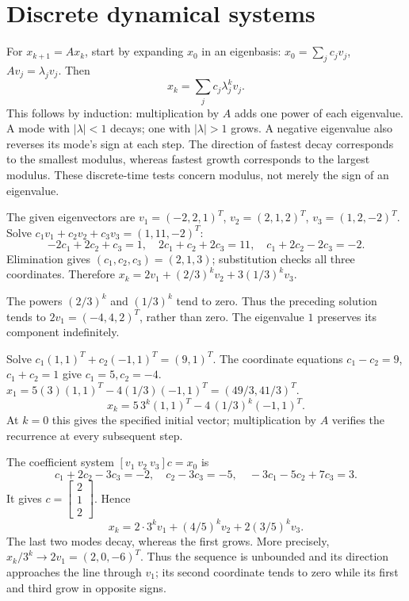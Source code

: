 \section{Discrete dynamical systems}
For $x_{k+1}=Ax_k$, start by expanding $x_0$ in an eigenbasis:
$x_0=\sum_j c_jv_j$, $Av_j=\lambda_jv_j$. Then
\[x_k=\sum_j c_j\lambda_j^kv_j.\]
This follows by induction: multiplication by $A$ adds one power of
each eigenvalue. A mode with $|\lambda|<1$ decays; one with
$|\lambda|>1$ grows. A negative eigenvalue also reverses its
mode's sign at each step. The direction of fastest decay corresponds
to the smallest modulus, whereas fastest growth corresponds to the
largest modulus. These discrete-time tests concern modulus, not merely
the sign of an eigenvalue.

The given eigenvectors are $v_1=(-2,2,1)^T$, $v_2=(2,1,2)^T$,
$v_3=(1,2,-2)^T$. Solve $c_1v_1+c_2v_2+c_3v_3=(1,11,-2)^T$:
\[-2c_1+2c_2+c_3=1,\quad2c_1+c_2+2c_3=11,
\quad c_1+2c_2-2c_3=-2.\]
Elimination gives $(c_1,c_2,c_3)=(2,1,3)$; substitution checks
all three coordinates. Therefore
$x_k=2v_1+(2/3)^kv_2+3(1/3)^kv_3$.

The powers $(2/3)^k$ and $(1/3)^k$ tend to zero. Thus the preceding
solution tends to $2v_1=(-4,4,2)^T$, rather than zero. The eigenvalue
$1$ preserves its component indefinitely.

Solve $c_1(1,1)^T+c_2(-1,1)^T=(9,1)^T$.
The coordinate equations $c_1-c_2=9$, $c_1+c_2=1$ give
$c_1=5,c_2=-4$.
$x_1=5(3)(1,1)^T-4(1/3)(-1,1)^T=(49/3,41/3)^T$.
\[x_k=5\,3^k(1,1)^T-4\,(1/3)^k(-1,1)^T.\]
At $k=0$ this gives the specified initial vector; multiplication by
$A$ verifies the recurrence at every subsequent step.

The coefficient system $[v_1\ v_2\ v_3]c=x_0$ is
\[c_1+2c_2-3c_3=-2,\quad c_2-3c_3=-5,
\quad-3c_1-5c_2+7c_3=3.\]
It gives $c=\left[\begin{matrix}2\\1\\2\end{matrix}\right]$. Hence
\[x_k=2\cdot3^kv_1+(4/5)^kv_2+2(3/5)^kv_3.\]
The last two modes decay, whereas the first grows. More precisely,
$x_k/3^k\to2v_1=(2,0,-6)^T$. Thus the sequence is unbounded and
its direction approaches the line through $v_1$; its second coordinate
tends to zero while its first and third grow in opposite signs.

